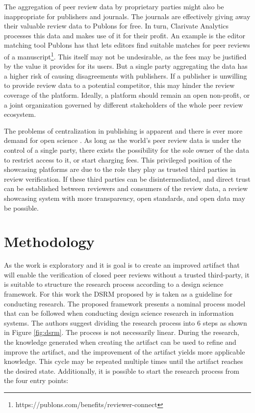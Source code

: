 The aggregation of peer review data by proprietary parties might also be inappropriate for publishers and journals. The journals are effectively giving away their valuable review data to Publons for free. In turn, Clarivate Analytics processes this data and makes use of it for their profit. An example is the editor matching tool Publons has that lets editors find suitable matches for peer reviews of a manuscript\footnote{https://publons.com/benefits/reviewer-connect}. This itself may not be undesirable, as the fees may be justified by the value it provides for its users. But a single party aggregating the data has a higher risk of causing disagreements with publishers. If a publisher is unwilling to provide review data to a potential competitor, this may hinder the review coverage of the platform. Ideally, a platform should remain an open non-profit, or a joint organization governed by different stakeholders of the whole peer review ecosystem.

The problems of centralization in publishing is apparent \parencite{Lariviere.2015} and there is ever more demand for open science \parencite[1-3]{Piwowar.2018}. As long as the world’s peer review data is under the control of a single party, there exists the possibility for the sole owner of the data to restrict access to it, or start charging fees. This privileged position of the showcasing platforms are due to the role they play as trusted third parties in review verification. If these third parties can be disintermediated, and direct trust can be established between reviewers and consumers of the review data, a review showcasing system with more transparency, open standards, and open data may be possible.






\section{Methodology}

As the work is exploratory and it is goal is to create an improved artifact that will enable the verification of closed peer reviews without a trusted third-party, it is suitable to structure the research process according to a design science framework. For this work the \acrfull{DSRM} proposed by \cite{Peffers.2007} is taken as a guideline for conducting research. The proposed framework presents a nominal process model that can be followed when conducting design science research in information systems. The authors suggest dividing the research process into 6 steps as shown in Figure \ref{fig:dsrm}. The process is not necessarily linear. During the research, the knowledge generated when creating the artifact can be used to refine and improve the artifact, and the improvement of the artifact yields more applicable knowledge. This cycle may be repeated multiple times until the artifact reaches the desired state. Additionally, it is possible to start the research process from the four entry points:

